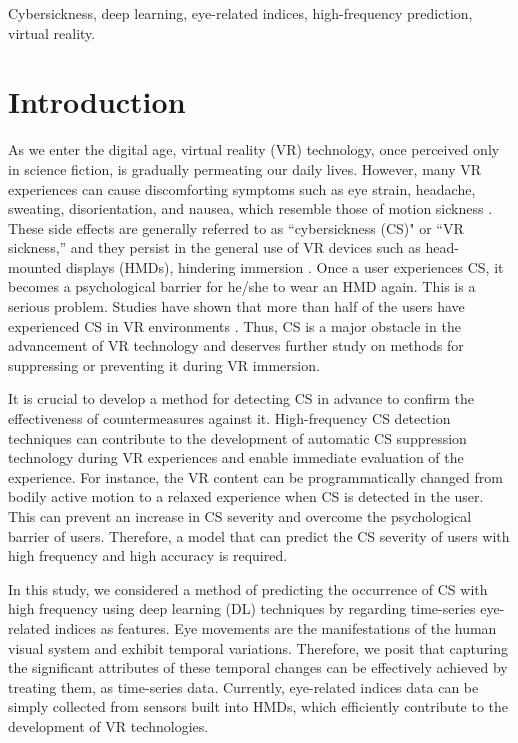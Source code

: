 \documentclass{ieeeaccess}
\begin{document}
\begin{keywords}
Cybersickness, deep learning, eye-related indices, high-frequency prediction, virtual reality.
\end{keywords}

\titlepgskip=-21pt

\maketitle

\section{Introduction} 
As we enter the digital age, virtual reality (VR) technology, once perceived only in science fiction, is gradually permeating our daily lives.
However, many VR experiences can cause discomforting symptoms such as eye strain, headache, sweating, disorientation, and nausea, which resemble those of motion sickness \cite{LaViola_2020}. These side effects are generally referred to as “cybersickness (CS)" or “VR sickness,” and they persist in the general use of VR devices such as head-mounted displays (HMDs), hindering immersion \cite{Davis_2014}. Once a user experiences CS, it becomes a psychological barrier for he/she to wear an HMD again. This is a serious problem. Studies have shown that more than half of the users have experienced CS in VR environments \cite{Munafo_2017, Kim_2005}. Thus, CS is a major obstacle in the advancement of VR technology and deserves further study on methods for suppressing or preventing it during VR immersion. 

It is crucial to develop a method for detecting CS in advance to confirm the effectiveness of countermeasures against it. High-frequency CS detection techniques can contribute to the development of automatic CS suppression technology during VR experiences \cite{Islam_2020} and enable immediate evaluation of the experience. For instance, the VR content can be programmatically changed from bodily active motion to a relaxed experience when CS is detected in the user. This can prevent an increase in CS severity and overcome the psychological barrier of users. Therefore, a model that can predict the CS severity of users with high frequency and high accuracy is required.

In this study, we considered a method of predicting the occurrence of CS with high frequency using deep learning (DL) techniques by regarding time-series eye-related indices as features. Eye movements are the manifestations of the human visual system and exhibit temporal variations. Therefore, we posit that capturing the significant attributes of these temporal changes can be effectively achieved by treating them, as time-series data. Currently, eye-related indices data can be simply collected from sensors built into HMDs, which efficiently contribute to the development of VR technologies.
\end{document}
